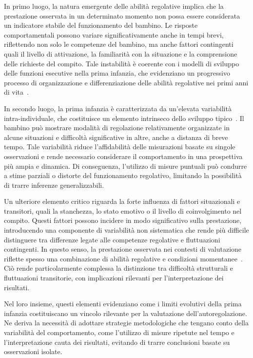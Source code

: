             In primo luogo, la natura emergente delle abilità regolative implica che la prestazione osservata in un determinato momento non possa essere considerata un indicatore stabile del funzionamento del bambino. Le risposte comportamentali possono variare significativamente anche in tempi brevi, riflettendo non solo le competenze del bambino, ma anche fattori contingenti quali il livello di attivazione, la familiarità con la situazione e la comprensione delle richieste del compito. Tale instabilità è coerente con i modelli di sviluppo delle funzioni esecutive nella prima infanzia, che evidenziano un progressivo processo di organizzazione e differenziazione delle abilità regolative nei primi anni di vita~\cite{garon2008}.

            In secondo luogo, la prima infanzia è caratterizzata da un'elevata variabilità intra-individuale, che costituisce un elemento intrinseco dello sviluppo tipico~\cite{diamond2013,garon2008}. Il bambino può mostrare modalità di regolazione relativamente organizzate in alcune situazioni e difficoltà significative in altre, anche a distanza di breve tempo. Tale variabilità riduce l'affidabilità delle misurazioni basate su singole osservazioni e rende necessario considerare il comportamento in una prospettiva più ampia e dinamica. Di conseguenza, l'utilizzo di misure puntuali può condurre a stime parziali o distorte del funzionamento regolativo, limitando la possibilità di trarre inferenze generalizzabili.

            Un ulteriore elemento critico riguarda la forte influenza di fattori situazionali e transitori, quali la stanchezza, lo stato emotivo o il livello di coinvolgimento nel compito. Questi fattori possono incidere in modo significativo sulla prestazione, introducendo una componente di variabilità non sistematica che rende più difficile distinguere tra differenze legate alle competenze regolative e fluttuazioni contingenti. In questo senso, la prestazione osservata nei contesti di valutazione riflette spesso una combinazione di abilità regolative e condizioni momentanee~\cite{carlson2005,berni2025}. Ciò rende particolarmente complessa la distinzione tra difficoltà strutturali e fluttuazioni transitorie, con implicazioni rilevanti per l'interpretazione dei risultati.

            Nel loro insieme, questi elementi evidenziano come i limiti evolutivi della prima infanzia costituiscano un vincolo rilevante per la valutazione dell'autoregolazione. Ne deriva la necessità di adottare strategie metodologiche che tengano conto della variabilità del comportamento, come l'utilizzo di misure ripetute nel tempo e l'interpretazione cauta dei risultati, evitando di trarre conclusioni basate su osservazioni isolate.

